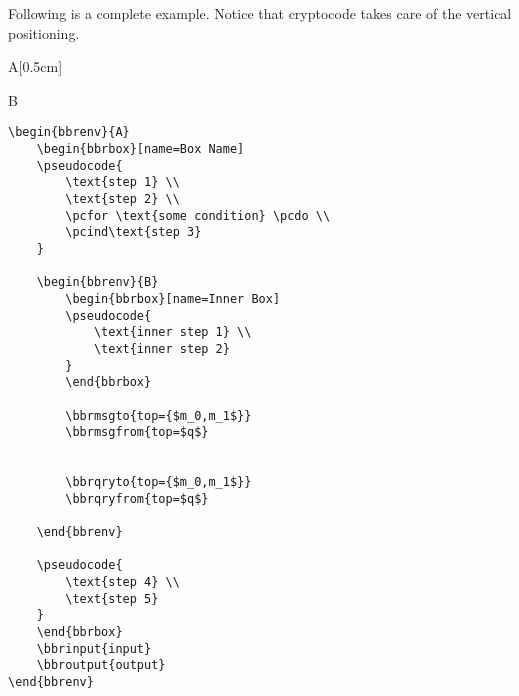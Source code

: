 \documentclass[a4paper]{report}
\begin{document}
Following is a complete example. Notice that cryptocode takes care of the vertical positioning.

\begin{bbrenv}[1cm]{A}[0.5cm]
	\begin{bbrbox}[name=Box Name]

	\begin{bbrenv}{B}
		\begin{bbrbox}[name=Inner Box]
		\end{bbrbox}
		



	\end{bbrenv}

	\end{bbrbox}
\end{bbrenv}

\begin{lstlisting}
\begin{bbrenv}{A}
	\begin{bbrbox}[name=Box Name]
	\pseudocode{
		\text{step 1} \\
		\text{step 2} \\
		\pcfor \text{some condition} \pcdo \\
		\pcind\text{step 3} 
	}

	\begin{bbrenv}{B}
		\begin{bbrbox}[name=Inner Box]
		\pseudocode{
			\text{inner step 1} \\
			\text{inner step 2} 
		}
		\end{bbrbox}
		
		\bbrmsgto{top={$m_0,m_1$}}
		\bbrmsgfrom{top=$q$}


		\bbrqryto{top={$m_0,m_1$}}
		\bbrqryfrom{top=$q$}

	\end{bbrenv}

	\pseudocode{
		\text{step 4} \\
		\text{step 5} 
	}
	\end{bbrbox}
	\bbrinput{input}
	\bbroutput{output}
\end{bbrenv}
\end{lstlisting}
\end{document}
